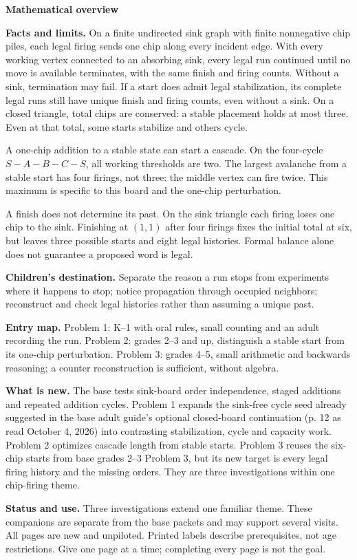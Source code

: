 \documentclass[11pt]{article}
\begin{document}
{\Large\bfseries Mathematical overview}\par\medskip
\textbf{Facts and limits.} On a finite undirected sink graph with finite nonnegative chip piles, each legal firing sends one chip along every incident edge. With every working vertex connected to an absorbing sink, every legal run continued until no move is available terminates, with the same finish and firing counts. Without a sink, termination may fail. If a start does admit legal stabilization, its complete legal runs still have unique finish and firing counts, even without a sink. On a closed triangle, total chips are conserved: a stable placement holds at most three. Even at that total, some starts stabilize and others cycle.

A one-chip addition to a stable state can start a cascade. On the four-cycle \(S-A-B-C-S\), all working thresholds are two. The largest avalanche from a stable start has four firings, not three: the middle vertex can fire twice. This maximum is specific to this board and the one-chip perturbation.

A finish does not determine its past. On the sink triangle each firing loses one chip to the sink. Finishing at \((1,1)\) after four firings fixes the initial total at six, but leaves three possible starts and eight legal histories. Formal balance alone does not guarantee a proposed word is legal.

\textbf{Children's destination.} Separate the reason a run stops from experiments where it happens to stop; notice propagation through occupied neighbors; reconstruct and check legal histories rather than assuming a unique past.

\textbf{Entry map.} Problem 1: K--1 with oral rules, small counting and an adult recording the run. Problem 2: grades 2--3 and up, distinguish a stable start from its one-chip perturbation. Problem 3: grades 4--5, small arithmetic and backwards reasoning; a counter reconstruction is sufficient, without algebra.

\textbf{What is new.} The base tests sink-board order independence, staged additions and repeated addition cycles. Problem 1 expands the sink-free cycle seed already suggested in the base adult guide's optional closed-board continuation (p. 12 as read October 4, 2026) into contrasting stabilization, cycle and capacity work. Problem 2 optimizes cascade length from stable starts. Problem 3 reuses the six-chip starts from base grades 2--3 Problem 3, but its new target is every legal firing history and the missing orders. They are three investigations within one chip-firing theme.
\par\medskip
\textbf{Status and use.} Three investigations extend one familiar theme. These companions are separate from the base packets and may support several visits. All pages are new and unpiloted. Printed labels describe prerequisites, not age restrictions. Give one page at a time; completing every page is not the goal.
\end{document}
